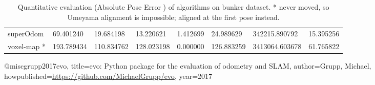 \begin{table}[]
{\begin{tabular}{llllllll}
		superOdom & 69.401240 & 19.684198 & 13.220621 & 1.412699 & 24.989629 & 342215.890792 & 15.395256 \\
		voxel-map * & 193.789434 & 110.834762 & 128.023198 & 0.000000 & 126.883259 & 3413064.603678 & 61.765822 \\
        	\end{tabular}%
        }
        	\caption{Quantitative evaluation (Absolute Pose Error \cite{grupp2017evo}) of algorithms on bunker dataset. * never moved, so Umeyama alignment is impossible; aligned at the first pose instead.}
        	\label{table3}
\end{table}

@misc{grupp2017evo,
  title={evo: Python package for the evaluation of odometry and SLAM},
  author={Grupp, Michael},
  howpublished={\url{https://github.com/MichaelGrupp/evo}},
  year={2017}
}
